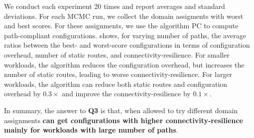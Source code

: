 We conduct each experiment 20 times and report averages and standard
deviations.  For each MCMC run, we collect the domain assigments with
worst and best scores.  For these assignments, we use the algorithm PC
to compute path-compliant configurations.
 shows, for varying number of paths, the average ratios
between the best- and worst-score configurations
in terms of
configuration overhead, number of static routes, and 
connectivity-resilience.
For smaller workloads, 
the algorithm reduces the configuration overhead, but increases
the number of static routes, leading to worse connectivity-resilience. For 
larger workloads, the algorithm can
reduce both static routes 
and configuration overhead by $0.3\times$
and improve the connectivity-resilience 
by $0.1\times$.

In summary, the answer to \textbf{Q3} is that,
when allowed to try different domain assignments
\textbf{\name can get configurations with higher connectivity-resilience mainly for workloads with large number of paths}.
